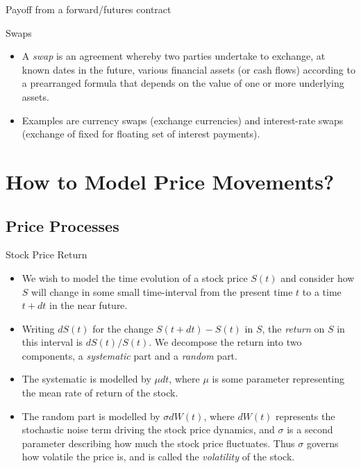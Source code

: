 {Payoff from a forward/futures contract}
\begin{figure}
  \centering
   \qquad
\end{figure}

{Swaps}
\begin{itemize}
\item<1->
A {\it swap} is an agreement whereby two parties
undertake to exchange, at known dates in the future, various
financial assets (or cash flows) according to a prearranged
formula that depends on the value of one or more underlying
assets.
\item<2->
Examples are currency swaps (exchange currencies) and
interest-rate swaps (exchange of fixed for floating set of
interest payments).
\end{itemize}

\section{How to Model Price Movements?}
\subsection{Price Processes}

{Stock Price Return}
\begin{itemize}
\item<1-> We wish to model the time evolution of a stock price
$S(t)$ and consider how $S$
will change in some small time-interval from the present time $t$
to a time $t+dt$ in the near future.
\item<2-> Writing $dS(t)$ for the
change $S(t+dt)-S(t)$ in $S$, the {\it return} on $S$ in this
interval is $dS(t)/S(t)$.
We decompose the return into two components, a {\it systematic}
part and a {\it random} part.
\item<3-> The systematic is modelled by $\mu dt$, where $\mu$ is some parameter
representing the mean rate of return of the stock.
\item<4->
The random part is modelled by $\sigma dW(t)$, where $dW(t)$
represents the stochastic noise term driving the stock price dynamics, and
$\sigma$ is a second parameter describing how much the stock price fluctuates. Thus $\sigma$
governs how volatile the price is, and is called the {\it
volatility} of the
stock.
\end{itemize}

